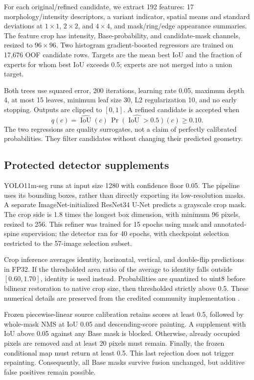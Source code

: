\documentclass[sigconf]{acmart}
\begin{document}
For each original/refined candidate, we extract 192 features: 17 morphology/intensity descriptors, a variant indicator, spatial means and standard deviations at $1\times1$, $2\times2$, and $4\times4$, and mask/ring/edge appearance summaries. The feature crop has intensity, Base-probability, and candidate-mask channels, resized to $96\times96$. Two histogram gradient-boosted regressors \cite{sklearn} are trained on 17,676 OOF candidate rows. Targets are the mean best IoU and the fraction of experts for whom best IoU exceeds 0.5; experts are not merged into a union target.

Both trees use squared error, 200 iterations, learning rate 0.05, maximum depth 4, at most 15 leaves, minimum leaf size 30, L2 regularization 10, and no early stopping. Outputs are clipped to $[0,1]$. A refined candidate is accepted when
\begin{equation}
q(c)=\widehat{\operatorname{IoU}}(c)\,\widehat{\Pr(\operatorname{IoU}>0.5)}(c)\geq0.10.
\end{equation}
The two regressions are quality surrogates, not a claim of perfectly calibrated probabilities. They filter candidates without changing their predicted geometry.

\subsection{Protected detector supplements}
YOLO11m-seg \cite{yolo11} runs at input size 1280 with confidence floor 0.05. The pipeline uses its bounding boxes, rather than directly exporting its low-resolution masks. A separate ImageNet-initialized ResNet34 U-Net predicts a grayscale crop mask. The crop side is 1.8 times the longest box dimension, with minimum 96 pixels, resized to 256. This refiner was trained for 15 epochs using mask and annotated-spine supervision; the detector ran for 40 epochs, with checkpoint selection restricted to the 57-image selection subset.

Crop inference averages identity, horizontal, vertical, and double-flip predictions in FP32. If the thresholded area ratio of the average to identity falls outside $[0.60,1.70]$, identity is used instead. Probabilities are quantized to uint8 before bilinear restoration to native crop size, then thresholded strictly above 0.5. These numerical details are preserved from the credited community implementation \cite{community}.

Frozen piecewise-linear source calibration retains scores at least 0.5, followed by whole-mask NMS at IoU 0.05 and descending-score painting. A supplement with IoU above 0.05 against any Base mask is blocked. Otherwise, already occupied pixels are removed and at least 20 pixels must remain. Finally, the frozen conditional map must return at least 0.5. This last rejection does not trigger repainting. Consequently, all Base masks survive fusion unchanged, but additive false positives remain possible.
\end{document}
